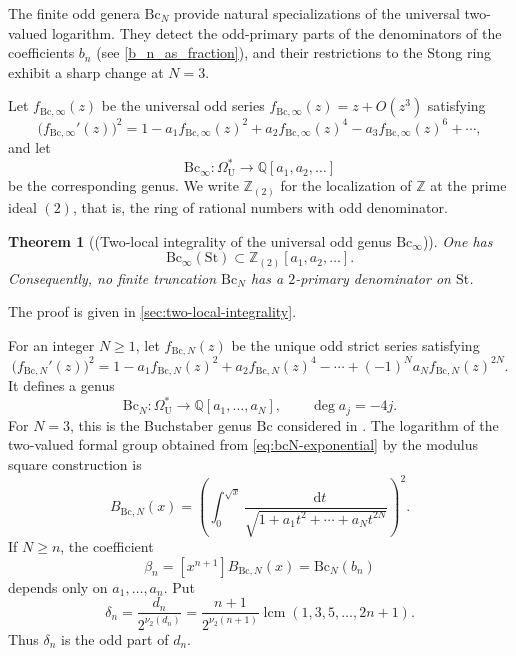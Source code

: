 \documentclass[14pt,dvipsnames]{extarticle}
\numberwithin{equation}{subsection}
\theoremstyle{plain}
\newtheorem{theorem}[theorem]{Theorem}
\theoremstyle{definition}
\theoremstyle{definition}
\DeclareMathOperator{\lcm}{lcm}
\newcommand{\dd}{\mathop{}\!\mathrm d}
\newcommand{\OmU}{\Omega_{\mathrm U}^{\ast}}
\newcommand{\Bc}{\mathrm{Bc}}
\newcommand{\St}{\mathrm{St}}
\newcommand{\Ztwo}{\mathbb{Z}_{(2)}}
\begin{document}
The finite odd genera $\Bc_N$ provide natural specializations of the universal
two-valued logarithm. They detect the odd-primary parts of the denominators of
the coefficients $b_n$ (see \eqref{b_n_as_fraction}), and their restrictions to the Stong ring exhibit a
sharp change at $N=3$.

Let $f_{\Bc,\infty}(z)$ be the universal odd series \(f_{\mathrm{Bc},\infty}(z)=z+O(z^3)\) satisfying
\begin{equation}\label{eq:bc-infty-exponential}
 \bigl(f_{\Bc,\infty}'(z)\bigr)^2
 =1-a_1f_{\Bc,\infty}(z)^2+a_2f_{\Bc,\infty}(z)^4-
  a_3f_{\Bc,\infty}(z)^6+\cdots,
\end{equation}
and let
\[
 \Bc_\infty\colon\OmU\longrightarrow\mathbb Q[a_1,a_2,\ldots]
\]
be the corresponding genus. We write $\Ztwo$ for the localization of
$\mathbb Z$ at the prime ideal $(2)$, that is, the ring of rational numbers
with odd denominator.

\begin{theorem}[(Two-local integrality of the universal odd genus $\Bc_{\infty}$)]
\label{thm:bc-infty-two-local}
One has
\[
 \Bc_\infty(\St)\subset\Ztwo[a_1,a_2,\ldots].
\]
Consequently, no finite truncation $\Bc_N$ has a $2$-primary denominator on
$\St$.
\end{theorem}

The proof is given in \cref{sec:two-local-integrality}.

For an integer $N\geq1$, let $f_{\Bc,N}(z)$ be the unique odd strict series
satisfying
\begin{equation}\label{eq:bcN-exponential}
 \bigl(f_{\Bc,N}'(z)\bigr)^2
 =1-a_1f_{\Bc,N}(z)^2+a_2f_{\Bc,N}(z)^4-
 \cdots+(-1)^Na_Nf_{\Bc,N}(z)^{2N}.
\end{equation}
It defines a genus
\[
 \Bc_N\colon\OmU\longrightarrow\mathbb Q[a_1,\ldots,a_N],
 \qquad \deg a_j=-4j.
\]
For $N=3$, this is the Buchstaber genus $\Bc$ considered in \cite{Kor26}.
The logarithm of the two-valued formal group obtained from
\eqref{eq:bcN-exponential} by the modulus square construction is
\begin{equation}\label{eq:bcN-two-valued-logarithm}
 B_{\Bc,N}(x)
 =\left(
   \int_0^{\sqrt{x}}
   \frac{\dd t}{\sqrt{1+a_1t^2+\cdots+a_Nt^{2N}}}
  \right)^2.
\end{equation}
If $N\geq n$, the coefficient
\[
 \beta_n=[x^{n+1}]B_{\Bc,N}(x)=\Bc_N(b_n)
\]
depends only on $a_1,\ldots,a_n$. Put
\begin{equation}\label{eq:def-delta-n}
 \delta_n
 =\frac{d_n}{2^{\nu_2(d_n)}}
 =\frac{n+1}{2^{\nu_2(n+1)}}
  \lcm(1,3,5,\ldots,2n+1).
\end{equation}
Thus $\delta_n$ is the odd part of $d_n$.
\end{document}
